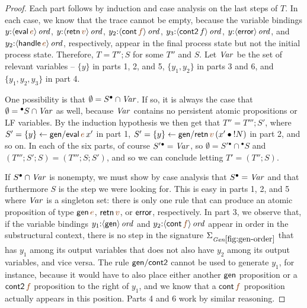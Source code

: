 \begin{proof}
  Each part follows by induction and case analysis on the last steps
  of $T$.  In each case, we know that the trace cannot be empty,
  because the variable bindings $y{:}\istrue{\susp{{\sf
        eval}\,\lf{e}}}$, $y{:}\istrue{\susp{{\sf retn}\,\lf{v}}}$,
  $y_2{:}\istrue{\susp{{\sf cont}\,\lf{f}}}$,
  $y_3{:}{\langle {{\sf cont2}\,f} \rangle}\,{{\it ord}}$, $y{:}{\langle {{\sf
        error}} \rangle}\,{{\it ord}}$, and $y_2{:}\istrue{\susp{{\sf handle}\,\lf{e}}}$,
  respectively, appear in the final process state but not the initial
  process state. Therefore, $T =
  T''; S$ for some $T''$ and $S$.  Let ${\it Var}$ be the set of relevant
  variables -- $\{y\}$ in parts 1, 2, and 5, $\{y_1, y_2\}$ in parts 3
  and 6, and $\{y_1,y_2,y_3\}$ in part 4. 

  One possibility is that $\emptyset = S^{\bullet} \cap {\it Var}$. If so, it
  is always the case that $\emptyset = {^{\bullet}S} \cap {\it Var}$ as well,
  because ${\it Var}$ contains no persistent atomic propositions or LF
  variables. By the induction hypothesis we then get that $T'' = T''';
  S'$, where $S' = \trstep{y}{{\sf gen/eval}\,\lf{e}\,x'}$ in part 1,
  $S' = \trstep{y}{{\sf gen/retn}\,\lf{v}\,(\tfuser{x'}{\tbangr{N}})}$
  in part 2, and so on.  In each of the six parts, of course
  $S'{^\bullet} = {\it Var}$, so $\emptyset = S'{^\bullet} \cap {^\bullet}S$
  and $\left(T'''; S'; S\right) = \left(T'''; S; S'\right)$, and so we can
  conclude letting $T' = \left(T''; S\right)$.

  If $S^{\bullet} \cap {\it Var}$ is nonempty, we must show by case
  analysis that $S^{\bullet} = {\it Var}$ and that furthermore $S$ is
  the step we were looking for. This is easy in parts 1, 2, and 5
  where ${\it Var}$ is a singleton set: there is only one rule that
  can produce an atomic proposition of type ${\sf gen}\,\lf{e}$, ${\sf
    retn}\,\lf{v}$, or ${\sf error}$, respectively.  In part 3, we
  observe that, if the variable bindings $y_1{:}{\langle {{\sf
        gen}} \rangle}\,{{\it ord}}$ and $y_2{:}\istrue{\susp{{\sf cont}\,\lf{f}}}$ appear
  in order in the substructural context, there is no step in the
  signature $\siggenorder$ that has $y_1$ among its output variables
  that does not also have $y_2$ among its output variables, and vice
  versa. The rule ${\sf gen/cont2}$ cannot be used to generate $y_1$,
  for instance, because it would have to also place either another
  ${\sf gen}$ proposition or a ${\sf cont2}\,{\lf f}$ proposition to
  the right of $y_1$, and we know that a ${\sf cont}\,{\lf f}$
  proposition actually appears in this position. Parts 4 and 6 work
  by similar reasoning.
\end{proof}

